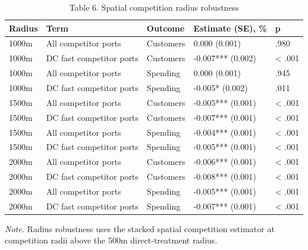 \begin{table}[!htbp]
\centering
\caption{Table 6. Spatial competition radius robustness}
\begin{tabular}{lllll}
\toprule
Radius & Term & Outcome & Estimate (SE), \% & p \\
\midrule
1000m & All competitor ports & Customers & 0.000 (0.001) & .980 \\
1000m & DC fast competitor ports & Customers & -0.007*** (0.002) & < .001 \\
1000m & All competitor ports & Spending & 0.000 (0.001) & .945 \\
1000m & DC fast competitor ports & Spending & -0.005* (0.002) & .011 \\
1500m & All competitor ports & Customers & -0.005*** (0.001) & < .001 \\
1500m & DC fast competitor ports & Customers & -0.007*** (0.001) & < .001 \\
1500m & All competitor ports & Spending & -0.004*** (0.001) & < .001 \\
1500m & DC fast competitor ports & Spending & -0.005*** (0.001) & < .001 \\
2000m & All competitor ports & Customers & -0.006*** (0.001) & < .001 \\
2000m & DC fast competitor ports & Customers & -0.008*** (0.001) & < .001 \\
2000m & All competitor ports & Spending & -0.005*** (0.001) & < .001 \\
2000m & DC fast competitor ports & Spending & -0.007*** (0.001) & < .001 \\
\bottomrule
\end{tabular}
\begin{minipage}{0.95\linewidth}\footnotesize\emph{Note.} Radius robustness uses the stacked spatial competition estimator at competition radii above the 500m direct-treatment radius.\end{minipage}
\end{table}
